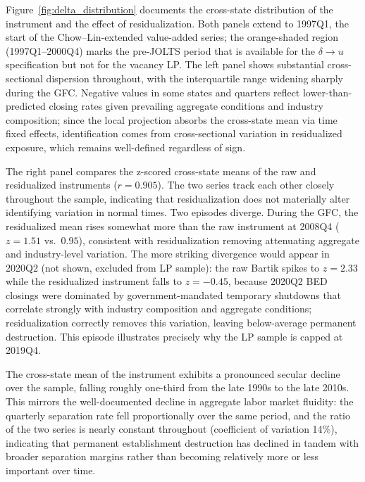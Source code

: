 \documentclass[authoryear, review, 12pt]{elsarticle}
\begin{document}
	Figure~\ref{fig:delta_distribution} documents the cross-state
	distribution of the instrument and the effect of residualization.
	Both panels extend to 1997Q1, the start of the Chow--Lin-extended
	value-added series; the orange-shaded region (1997Q1--2000Q4) marks
	the pre-JOLTS period that is available for the $\delta\to u$
	specification but not for the vacancy LP.
	The left panel shows substantial cross-sectional dispersion
	throughout, with the interquartile range widening sharply during the
	GFC.  Negative values in some states and quarters reflect
	lower-than-predicted closing rates given prevailing aggregate
	conditions and industry composition; since the local projection
	absorbs the cross-state mean via time fixed effects, identification
	comes from cross-sectional variation in residualized exposure, which
	remains well-defined regardless of sign.

	The right panel compares the z-scored cross-state means of the raw
	and residualized instruments ($r = 0.905$).  The two series track
	each other closely throughout the sample, indicating that
	residualization does not materially alter identifying variation in
	normal times.  Two episodes diverge.  During the GFC, the
	residualized mean rises somewhat more than the raw instrument at
	2008Q4 ($z = 1.51$ vs.\ $0.95$), consistent with residualization
	removing attenuating aggregate and industry-level variation.  The
	more striking divergence would appear in 2020Q2 (not shown, excluded
	from LP sample): the raw Bartik spikes to $z = 2.33$ while the
	residualized instrument falls to $z = -0.45$, because 2020Q2 BED
	closings were dominated by government-mandated temporary shutdowns
	that correlate strongly with industry composition and aggregate
	conditions; residualization correctly removes this variation, leaving
	below-average permanent destruction.  This episode illustrates
	precisely why the LP sample is capped at 2019Q4.

	The cross-state mean of the instrument exhibits a pronounced secular
	decline over the sample, falling roughly one-third from the late
	1990s to the late 2010s.  This mirrors the well-documented decline in
	aggregate labor market fluidity: the \citet{shimer_2005} quarterly
	separation rate fell proportionally over the same period, and the
	ratio of the two series is nearly constant throughout (coefficient of
	variation 14\%), indicating that permanent establishment destruction
	has declined in tandem with broader separation margins rather than
	becoming relatively more or less important over time.
\end{document}
